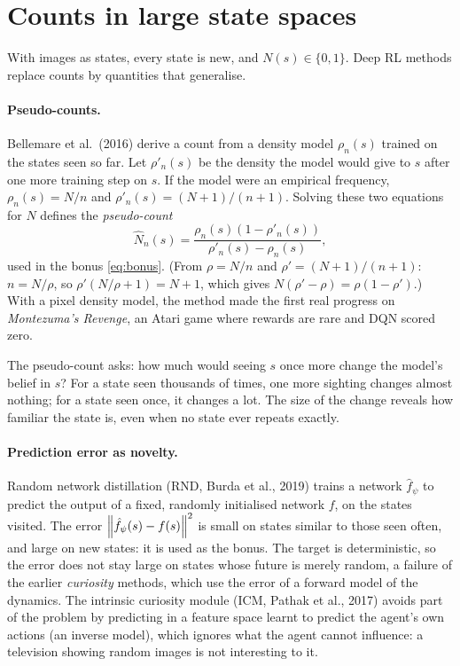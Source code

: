 \section{Counts in large state spaces}

With images as states, every state is new, and $N(s) \in \{0, 1\}$. Deep
RL methods replace counts by quantities that generalise.

\paragraph{Pseudo-counts.} Bellemare et al.\ (2016) derive a count from a
density model $\rho_n(s)$ trained on the states seen so far. Let $\rho'_n(s)$
be the density the model would give to $s$ after one more training step on
$s$. If the model were an empirical frequency, $\rho_n(s) = N / n$ and
$\rho'_n(s) = (N + 1) / (n + 1)$. Solving these two equations for $N$
defines the \emph{pseudo-count}
\begin{equation}
  \hat N_n(s) = \frac{\rho_n(s) \left( 1 - \rho'_n(s) \right)}{\rho'_n(s) -
  \rho_n(s)},
\end{equation}
used in the bonus \eqref{eq:bonus}. (From $\rho = N/n$ and $\rho' = (N +
1)/(n + 1)$: $n = N / \rho$, so $\rho' (N/\rho + 1) = N + 1$, which gives
$N (\rho' - \rho) = \rho (1 - \rho')$.) With a pixel density model, the
method made the first real progress on \emph{Montezuma's Revenge}, an
Atari game where rewards are rare and DQN scored zero.

\begin{intuition}
  The pseudo-count asks: how much would seeing $s$ once more change the
  model's belief in $s$? For a state seen thousands of times, one more
  sighting changes almost nothing; for a state seen once, it changes a lot.
  The size of the change reveals how familiar the state is, even when no
  state ever repeats exactly.
\end{intuition}

\paragraph{Prediction error as novelty.} Random network distillation
(RND, Burda et al., 2019) trains a network $\hat f_\psi$ to predict the
output of a fixed, randomly initialised network $f$, on the states visited.
The error $\left\lVert \hat f_\psi(s) - f(s) \right\rVert^2$ is small on states similar to
those seen often, and large on new states: it is used as the bonus. The
target is deterministic, so the error does not stay large on states whose
future is merely random, a failure of the earlier \emph{curiosity}
methods, which use the error of a forward model of the dynamics. The
intrinsic curiosity module (ICM, Pathak et al., 2017) avoids part of the
problem by predicting in a feature space learnt to predict the agent's own
actions (an inverse model), which ignores what the agent cannot influence:
a television showing random images is not interesting to it.

